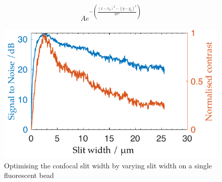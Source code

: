 \begin{align}
  A e^{-\left(\frac{(x-x_0)^2-(y-y_0)^2}{2\sigma^2}\right)}
\end{align}

\begin{figure}
  \centering
  \includegraphics{Chapters/dualslit/Figs/PDF/optimal_slit_snr_contrast}
  \caption{Optimising the confocal slit width by varying slit width on a single fluorescent bead}
  \label{fig:optimal_slit_snr_contrast}
\end{figure}






